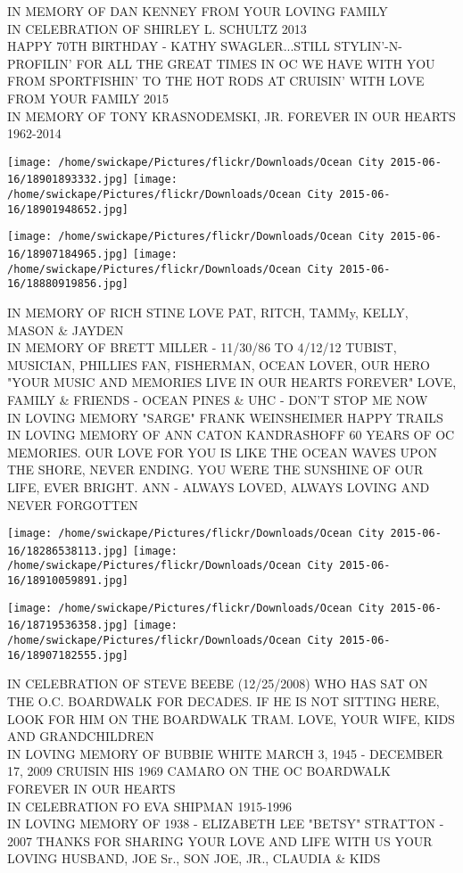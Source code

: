 \documentclass[10pt,letterpaper]{article}
\begin{document}
IN MEMORY OF DAN KENNEY FROM YOUR LOVING FAMILY\\
IN CELEBRATION OF SHIRLEY L. SCHULTZ 2013\\
HAPPY 70TH BIRTHDAY {-} KATHY SWAGLER...STILL STYLIN'{-}N{-}PROFILIN' FOR ALL THE GREAT TIMES IN OC WE HAVE WITH YOU FROM SPORTFISHIN' TO THE HOT RODS AT CRUISIN' WITH LOVE FROM YOUR FAMILY 2015\\
IN MEMORY OF TONY KRASNODEMSKI, JR.  FOREVER IN OUR HEARTS 1962{-}2014\\
\pagebreak

\texttt{[image: /home/swickape/Pictures/flickr/Downloads/Ocean City 2015-06-16/18901893332.jpg]}
\texttt{[image: /home/swickape/Pictures/flickr/Downloads/Ocean City 2015-06-16/18901948652.jpg]}

\texttt{[image: /home/swickape/Pictures/flickr/Downloads/Ocean City 2015-06-16/18907184965.jpg]}
\texttt{[image: /home/swickape/Pictures/flickr/Downloads/Ocean City 2015-06-16/18880919856.jpg]}

IN MEMORY OF RICH STINE LOVE PAT, RITCH, TAMMy, KELLY, MASON \& JAYDEN\\
IN MEMORY OF BRETT MILLER {-} 11/30/86 TO 4/12/12 TUBIST, MUSICIAN, PHILLIES FAN, FISHERMAN, OCEAN LOVER, OUR HERO "YOUR MUSIC AND MEMORIES LIVE IN OUR HEARTS FOREVER" LOVE, FAMILY \& FRIENDS {-} OCEAN PINES \& UHC {-} DON'T STOP ME NOW\\
IN LOVING MEMORY "SARGE" FRANK WEINSHEIMER HAPPY TRAILS\\
IN LOVING MEMORY OF ANN CATON KANDRASHOFF 60 YEARS OF OC MEMORIES.  OUR LOVE FOR YOU IS LIKE THE OCEAN WAVES UPON THE SHORE, NEVER ENDING.  YOU WERE THE SUNSHINE OF OUR LIFE, EVER BRIGHT.  ANN {-} ALWAYS LOVED, ALWAYS LOVING AND NEVER FORGOTTEN\\
\pagebreak

\texttt{[image: /home/swickape/Pictures/flickr/Downloads/Ocean City 2015-06-16/18286538113.jpg]}
\texttt{[image: /home/swickape/Pictures/flickr/Downloads/Ocean City 2015-06-16/18910059891.jpg]}

\texttt{[image: /home/swickape/Pictures/flickr/Downloads/Ocean City 2015-06-16/18719536358.jpg]}
\texttt{[image: /home/swickape/Pictures/flickr/Downloads/Ocean City 2015-06-16/18907182555.jpg]}

IN CELEBRATION OF STEVE BEEBE (12/25/2008) WHO HAS SAT ON THE O.C. BOARDWALK FOR DECADES.  IF HE IS NOT SITTING HERE, LOOK FOR HIM ON THE BOARDWALK TRAM.  LOVE, YOUR WIFE, KIDS AND GRANDCHILDREN\\
IN LOVING MEMORY OF BUBBIE WHITE MARCH 3, 1945 {-} DECEMBER 17, 2009 CRUISIN HIS 1969 CAMARO ON THE OC BOARDWALK FOREVER IN OUR HEARTS\\
IN CELEBRATION FO EVA SHIPMAN 1915{-}1996\\
IN LOVING MEMORY OF 1938 {-} ELIZABETH LEE "BETSY" STRATTON {-} 2007 THANKS FOR SHARING YOUR LOVE AND LIFE WITH US YOUR LOVING HUSBAND, JOE Sr., SON JOE, JR., CLAUDIA \& KIDS\\
\pagebreak
\end{document}
